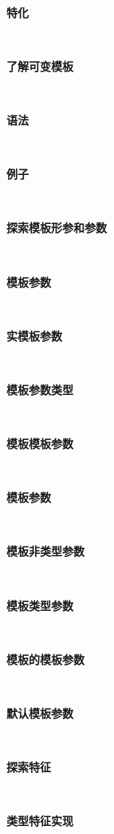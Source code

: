 \noindent\textbf{}\ \par
\textbf{特化} \ \par

\noindent\textbf{}\ \par
\textbf{了解可变模板} \ \par

\noindent\textbf{}\ \par
\textbf{语法} \ \par

\noindent\textbf{}\ \par
\textbf{例子} \ \par

\noindent\textbf{}\ \par
\textbf{探索模板形参和参数} \ \par

\noindent\textbf{}\ \par
\textbf{模板参数} \ \par

\noindent\textbf{}\ \par
\textbf{实模板参数} \ \par

\noindent\textbf{}\ \par
\textbf{模板参数类型} \ \par

\noindent\textbf{}\ \par
\textbf{模板模板参数} \ \par

\noindent\textbf{}\ \par
\textbf{模板参数} \ \par

\noindent\textbf{}\ \par
\textbf{模板非类型参数} \ \par

\noindent\textbf{}\ \par
\textbf{模板类型参数} \ \par

\noindent\textbf{}\ \par
\textbf{模板的模板参数} \ \par

\noindent\textbf{}\ \par
\textbf{默认模板参数} \ \par

\noindent\textbf{}\ \par
\textbf{探索特征} \ \par

\noindent\textbf{}\ \par
\textbf{类型特征实现} \ \par


